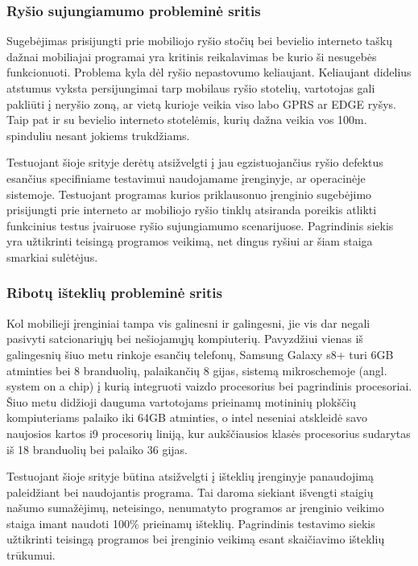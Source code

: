 \documentclass{VUMIFPSkursinis}
\begin{document}
\subsubsection{Ryšio sujungiamumo probleminė sritis}
Sugebėjimas prisijungti prie mobiliojo ryšio stočių bei bevielio interneto taškų dažnai mobiliajai programai yra kritinis reikalavimas be kurio ši nesugebės funkcionuoti. Problema kyla dėl ryšio nepastovumo keliaujant. Keliaujant didelius atstumus vyksta persijungimai tarp mobilaus ryšio stotelių, vartotojas gali pakliūti į neryšio zoną, ar vietą kurioje veikia viso labo GPRS ar EDGE ryšys. Taip pat ir su bevielio interneto stotelėmis, kurių dažna veikia vos 100m. spinduliu nesant jokiems trukdžiams. 

Testuojant šioje srityje derėtų atsižvelgti į jau egzistuojančius ryšio defektus esančius specifiniame testavimui naudojamame įrenginyje, ar operacinėje sistemoje. \cite{android_bugs} Testuojant programas kurios priklausonuo įrenginio sugebėjimo prisijungti prie interneto ar mobiliojo ryšio tinklų atsiranda poreikis atlikti funkcinius testus įvairuose ryšio sujungiamumo scenarijuose. Pagrindinis siekis yra užtikrinti teisingą programos veikimą, net dingus ryšiui ar šiam staiga smarkiai sulėtėjus.

\subsubsection{Ribotų išteklių probleminė sritis}
Kol mobilieji įrenginiai tampa vis galinesni ir galingesni, jie vis dar negali pasivyti satcionariųjų bei nešiojamųjų kompiuterių. Pavyzdžiui vienas iš galingesnių šiuo metu rinkoje esančių telefonų, Samsung Galaxy s8+ turi 6GB atminties bei 8 branduolių, palaikančių 8 gijas, sistemą mikroschemoje (angl. system on a chip) į kurią integruoti vaizdo procesorius bei pagrindinis procesoriai. \cite{samsung_s8} Šiuo metu didžioji dauguma vartotojams prieinamų motininių plokščių kompiuteriams palaiko iki 64GB atminties, o intel neseniai atskleidė savo naujosios kartos i9 procesorių liniją, kur aukščiausios klasės procesorius sudarytas iš 18 branduolių bei palaiko 36 gijas. \cite{intel_i9}

Testuojant šioje srityje būtina atsižvelgti į išteklių įrenginyje panaudojimą paleidžiant bei naudojantis programa. Tai daroma siekiant išvengti staigių našumo sumažėjimų, neteisingo, nenumatyto programos ar įrenginio veikimo staiga imant naudoti 100\% prieinamų išteklių. Pagrindinis testavimo siekis užtikrinti teisingą programos bei įrenginio veikimą esant skaičiavimo išteklių trūkumui.
\end{document}
